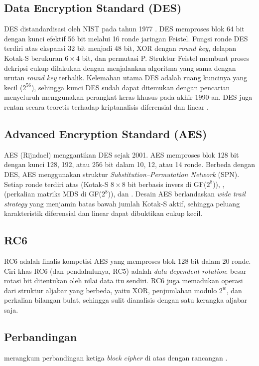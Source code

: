 \subsection{Data Encryption Standard (DES)}
DES distandardisasi oleh NIST pada tahun 1977 \cite{fips46}. DES memproses blok 64 bit dengan kunci efektif 56 bit melalui 16 ronde jaringan Feistel. Fungsi ronde DES terdiri atas ekspansi 32 bit menjadi 48 bit, XOR dengan \textit{round key}, delapan Kotak-S berukuran $6 \times 4$ bit, dan permutasi P. Struktur Feistel membuat proses dekripsi cukup dilakukan dengan menjalankan algoritma yang sama dengan urutan \textit{round key} terbalik. Kelemahan utama DES adalah ruang kuncinya yang kecil ($2^{56}$), sehingga kunci DES sudah dapat ditemukan dengan pencarian menyeluruh menggunakan perangkat keras khusus pada akhir 1990-an. DES juga rentan secara teoretis terhadap kriptanalisis diferensial \cite{biham1991} dan linear \cite{matsui1994}.

\subsection{Advanced Encryption Standard (AES)}
AES (Rijndael) \cite{fips197, daemen2002} menggantikan DES sejak 2001. AES memproses blok 128 bit dengan kunci 128, 192, atau 256 bit dalam 10, 12, atau 14 ronde. Berbeda dengan DES, AES menggunakan struktur \textit{Substitution--Permutation Network} (SPN). Setiap ronde terdiri atas  (Kotak-S $8 \times 8$ bit berbasis invers di GF($2^8$)), ,  (perkalian matriks MDS di GF($2^8$)), dan . Desain AES berlandaskan \textit{wide trail strategy} yang menjamin batas bawah jumlah Kotak-S aktif, sehingga peluang karakteristik diferensial dan linear dapat dibuktikan cukup kecil.

\subsection{RC6}
RC6 \cite{rivest1998} adalah finalis kompetisi AES yang memproses blok 128 bit dalam 20 ronde. Ciri khas RC6 (dan pendahulunya, RC5) adalah \textit{data-dependent rotation}: besar rotasi bit ditentukan oleh nilai data itu sendiri. RC6 juga memadukan operasi dari struktur aljabar yang berbeda, yaitu XOR, penjumlahan modulo $2^w$, dan perkalian bilangan bulat, sehingga sulit dianalisis dengan satu kerangka aljabar saja.

\subsection{Perbandingan}
 merangkum perbandingan ketiga \textit{block cipher} di atas dengan rancangan \algname.

